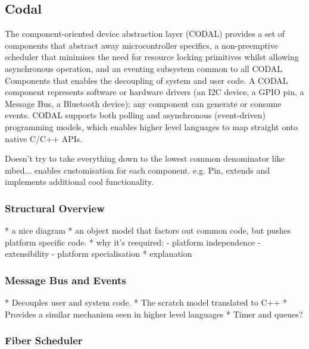 

\subsection{Codal}

The component-oriented device abstraction layer (CODAL) provides a set of components that abstract away microcontroller specifics, a non-preemptive scheduler that minimises the need for resource locking primitives whilst allowing asynchronous operation, and an eventing subsystem common to all CODAL Components that enables the decoupling of system and user code. A CODAL component represents software or hardware drivers (an I2C device, a GPIO pin, a Message Bus, a Bluetooth device); any component can generate or consume events. CODAL supports both polling and asynchronous (event-driven) programming models, which enables higher level languages to map straight onto native C/C++ APIs.

Doesn't try to take everything down to the lowest common denominator like mbed... enables customisation for each component. e.g. Pin, extends and implements additional cool functionality.

\subsubsection{Structural Overview}

* a nice diagram
* an object model that factors out common code, but pushes platform specific code.
* why it's reequired:
    - platform independence
    - extensibility
    - platform specialisation
* explanation

\subsubsection{Message Bus and Events}

* Decouples user and system code.
* The scratch model translated to C++
* Provides a similar mechanism seen in higher level languages
* Timer and queues?

\subsubsection{Fiber Scheduler}

